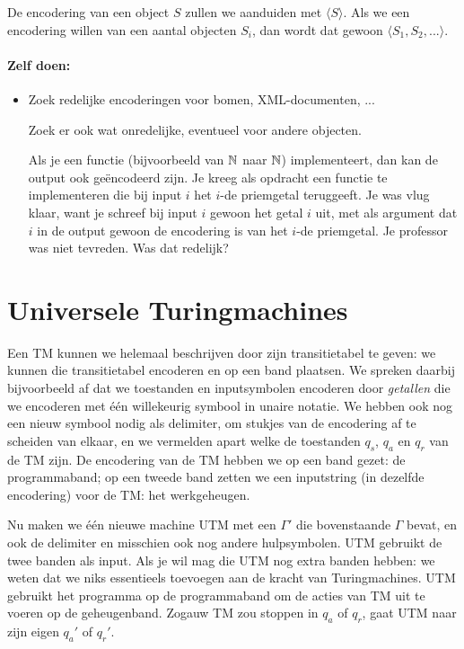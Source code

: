 De encodering van een object $S$ zullen we aanduiden met $\langle S \rangle$. Als we
een encodering willen van een aantal objecten $S_i$, dan wordt dat
gewoon $\langle S_1,S_2,... \rangle$.

\paragraph{Zelf doen:}

\begin{itemize}
\item[]
Zoek redelijke encoderingen voor bomen, XML-documenten, ...

Zoek er ook wat onredelijke, eventueel voor andere objecten.

Als je een functie (bijvoorbeeld van $\mathbb{N}$ naar $\mathbb{N}$) implementeert,
dan kan de output ook ge\"{e}ncodeerd zijn. Je kreeg als opdracht een
functie te implementeren die bij input $i$ het $i$-de priemgetal
teruggeeft. Je was vlug klaar, want je schreef bij input $i$ gewoon
het getal $i$ uit, met als argument dat $i$ in de output gewoon de
encodering is van het $i$-de priemgetal. Je professor was niet
tevreden. Was dat redelijk?

\end{itemize}

\section{Universele Turingmachines}

Een TM kunnen we helemaal beschrijven door zijn transitietabel te
geven: we kunnen die transitietabel encoderen en op een band
plaatsen. We spreken daarbij bijvoorbeeld af dat we toestanden en
inputsymbolen encoderen door {\em getallen} die we encoderen met \'{e}\'{e}n 
willekeurig symbool in unaire notatie. We hebben ook nog een nieuw
symbool nodig als delimiter, om stukjes van de encodering af te
scheiden van elkaar, en we vermelden apart welke de toestanden $q_s$,
$q_a$ en $q_r$ van de TM zijn. De encodering van de TM hebben we op
een band gezet: de programmaband; op een tweede band zetten we een
inputstring (in dezelfde encodering) voor de TM: het werkgeheugen.


Nu maken we \'{e}\'{e}n nieuwe machine UTM met een $\Gamma'$ die
bovenstaande $\Gamma$ bevat, en ook de delimiter en misschien ook nog
andere hulpsymbolen. UTM gebruikt de twee banden als input. Als je wil
mag die UTM nog extra banden hebben: we weten dat we niks essentieels
toevoegen aan de kracht van Turingmachines. UTM gebruikt het programma
op de programmaband om de acties van TM uit te voeren op de
geheugenband. Zogauw TM zou stoppen in $q_a$ of $q_r$, gaat UTM naar
zijn eigen $q_a'$ of $q_r'$.


